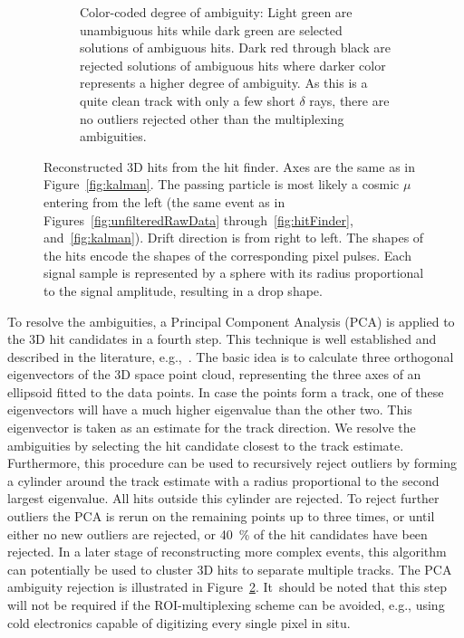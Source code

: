 \documentclass[instruments,article,accept,moreauthors,pdftex]{Definitions/mdpi}
\begin{document}
\begin{figure}[H]
\begin{subfigure}{\textwidth}
		\caption{Color-coded degree of ambiguity:
			Light green are unambiguous hits while dark green are selected solutions of ambiguous hits.
			Dark red through black are rejected solutions of ambiguous hits where darker color represents a higher degree of ambiguity.
			As this is a quite clean track with only a few short $\delta$ rays, there are no outliers rejected other than the multiplexing ambiguities.}
		\label{fig:pca_c}
	\end{subfigure}
	\vspace{6pt}

	\caption{Reconstructed 3D hits from the hit finder.
		Axes are the same as in Figure~\ref{fig:kalman}.
		The passing particle is most likely a cosmic $\mu$ entering from the left (the same event as in Figures~\ref{fig:unfilteredRawData} through~\ref{fig:hitFinder}, and~\ref{fig:kalman}).
		Drift direction is from right to left.
		The shapes of the hits encode the shapes of the corresponding pixel pulses.
		Each signal sample is represented by a sphere with its radius proportional to the signal amplitude, resulting in a drop shape.}
	\label{fig:pca}
\end{figure}

To resolve the ambiguities, a Principal Component Analysis (PCA) is applied to the 3D hit candidates in a fourth step.
This technique is well established and described in the literature, e.g.,~\cite{pca}.
The basic idea is to calculate three orthogonal eigenvectors of the 3D space point cloud, representing the three axes of an ellipsoid fitted to the data points.
In case the points form a track, one of these eigenvectors will have a much higher eigenvalue than the other two.
This eigenvector is taken as an estimate for the track direction.
We resolve the ambiguities by selecting the hit candidate closest to the track estimate.
Furthermore, this procedure can be used to recursively reject outliers by forming a cylinder around the track estimate with a radius proportional to the second largest eigenvalue.
All hits outside this cylinder are rejected.
To reject further outliers the PCA is rerun on the remaining points up to three times, or until either no new outliers are rejected, or \SI{40}{\percent} of the hit candidates have been rejected.
In a later stage of reconstructing more complex events, this algorithm can potentially be used to cluster 3D hits to separate multiple tracks.
The PCA ambiguity rejection is illustrated in Figure~\ref{fig:pca}.
It~should be noted that this step will not be required if the ROI-multiplexing scheme can be avoided, e.g., using cold electronics capable of digitizing every single pixel in situ. 
\end{document}
